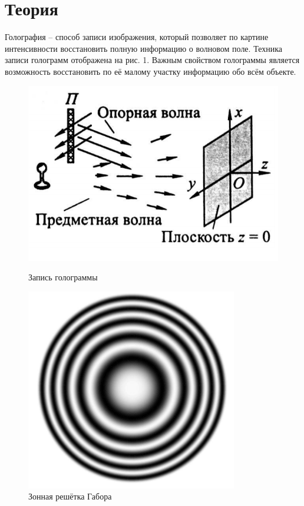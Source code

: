 \section*{Теория}
Голография -- способ записи изображения, который позволяет по картине интенсивности восстановить полную информацию о волновом поле. Техника записи голограмм отображена на рис. 1. Важным свойством голограммы является возможность восстановить по её малому участку информацию обо всём объекте. 

\begin{figure}[tbp]	
	\centering
	\begin{minipage}{0.49\linewidth}
		\centering
		\includegraphics[width=0.8\linewidth]{../Изображения/Формирование.png}
		\caption{Запись голограммы}
	\end{minipage}
	\begin{minipage}{0.49\linewidth}
		\centering
		\includegraphics[width=0.8\linewidth]{../Изображения/Габор.png}
		\caption{Зонная решётка Габора}
	\end{minipage}
\end{figure}

